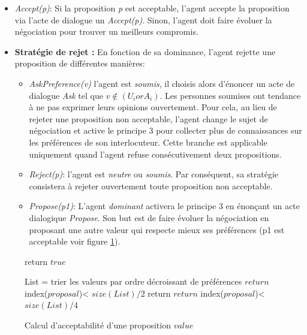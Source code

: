 	\begin{itemize}	
		\item  \emph{Accept(p)}: Si la proposition \emph{p} est acceptable, l'agent accepte la proposition via l'acte de dialogue un \emph{Accept(p)}. Sinon, l'agent doit faire évoluer la négociation pour trouver un meilleurs compromis. 
		\item \textbf{Stratégie de rejet :} En fonction de sa dominance, l'agent rejette une proposition de différentes manières:
		\begin{itemize}[label= $\circ$]
			\item \emph{AskPreference(v)} l'agent est \emph{soumis}, il choisis alors d'énoncer un acte de dialogue \emph{Ask} tel que $v \not\in (U_i or A_i)$. Les personnes soumises ont tendance à ne pas exprimer leurs opinions ouvertement. Pour cela, au lieu de rejeter une proposition non acceptable, l'agent change le sujet de négociation et active le principe 3 pour collecter plus de connaissances sur les préférences de son interlocuteur. Cette branche est applicable uniquement quand l'agent refuse consécutivement deux propositions.  
			
			\item \emph{Reject(p)}: l'agent est \emph{neutre} ou \emph{soumis}. Par conséquent, sa stratégie consistera à rejeter ouvertement toute proposition non acceptable.
			
			\item \emph{Propose(p1)}: L'agent \emph{dominant} activera le principe 3 en énonçant un acte dialogique \emph{Propose}. Son but est de faire évoluer la négociation en proposant une autre valeur qui respecte mieux ses préférences (p1 est acceptable voir figure \ref{alg:pseudo}). 
		
		\end{itemize}
	\end{itemize}
	\begin{figure}[]
		\caption{\label{alg:pseudo} Calcul d'acceptabilité d'une proposition $value$}
		\begin{algorithmic}[1]
			\State return $true$
			\EndIf
			
			\State List = trier les valeurs par ordre décroissant de préférences
			\State $return$ index($proposal$)< $size(List)/2$
			\EndIf
			\State return $return$ index($proposal$)< $size(List)/4$
			\EndIf
			\EndFunction
		\end{algorithmic}
	\end{figure}
	
